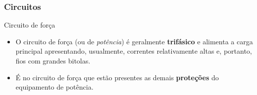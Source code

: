 

\begin{frame}
	\frametitle{Circuitos}
	\begin{block}{Circuito de força}
		\begin{itemize}
			\item O circuito de força (ou de \textit{potência}) é geralmente \textbf{trifásico} e alimenta a carga principal apresentando, usualmente, correntes relativamente altas e, portanto, fios com grandes bitolas.
			\item É no circuito de força que estão presentes as demais \textbf{proteções} do equipamento de potência.
		\end{itemize}
	\end{block}
\end{frame}

